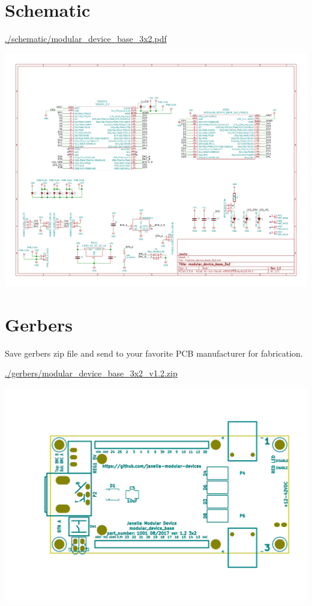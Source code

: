 \documentclass[11pt]{article}
\begin{document}
\section{Schematic}
\label{sec:orge89ed89}

\href{./schematic/modular\_device\_base\_3x2.pdf}{./schematic/modular\_device\_base\_3x2.pdf}


\begin{center}
\includegraphics[width=.9\linewidth]{./schematic/images/schematic00.png}
\end{center}


\section{Gerbers}
\label{sec:org786d806}

Save gerbers zip file and send to your favorite PCB manufacturer for
fabrication.

\href{./gerbers/modular\_device\_base\_3x2\_v1.2.zip}{./gerbers/modular\_device\_base\_3x2\_v1.2.zip}


\begin{center}
\includegraphics[width=.9\linewidth]{./gerbers/images/gerbers00.png}
\end{center}
\end{document}
